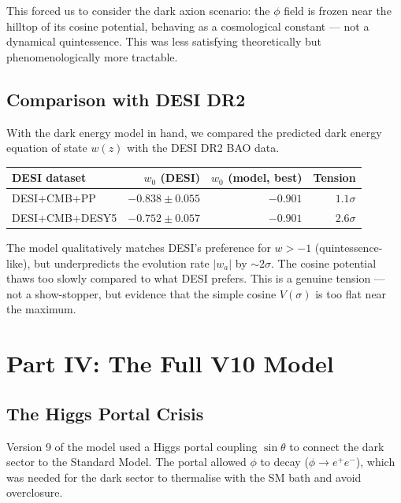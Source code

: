 \documentclass[12pt, a4paper]{article}
\newcommand{\dateentry}[1]{\medskip\noindent{\footnotesize\color{journalgray}\textbf{Date:}~#1}\smallskip}
\begin{document}
This forced us to consider the dark axion scenario: the $\phi$ field is frozen near the hilltop of its cosine potential, behaving as a cosmological constant --- not a dynamical quintessence. This was less satisfying theoretically but phenomenologically more tractable.

\subsection{Comparison with DESI DR2}

With the dark energy model in hand, we compared the predicted dark energy equation of state $w(z)$ with the DESI DR2 BAO data.

\begin{center}
\begin{tabular}{lrrr}
  \toprule
  DESI dataset & $w_0$ (DESI) & $w_0$ (model, best) & Tension \\
  \midrule
  DESI+CMB+PP  & $-0.838 \pm 0.055$ & $-0.901$ & $1.1\sigma$ \\
  DESI+CMB+DESY5 & $-0.752 \pm 0.057$ & $-0.901$ & $2.6\sigma$ \\
  \bottomrule
\end{tabular}
\end{center}

The model qualitatively matches DESI's preference for $w > -1$ (quintessence-like), but underpredicts the evolution rate $|w_a|$ by $\sim 2\sigma$. The cosine potential thaws too slowly compared to what DESI prefers. This is a genuine tension --- not a show-stopper, but evidence that the simple cosine $V(\sigma)$ is too flat near the maximum.

\newpage

\section{Part IV: The Full V10 Model}

\subsection{The Higgs Portal Crisis}

\dateentry{March 2026}

Version 9 of the model used a Higgs portal coupling $\sin\theta$ to connect the dark sector to the Standard Model. The portal allowed $\phi$ to decay ($\phi \to e^+e^-$), which was needed for the dark sector to thermalise with the SM bath and avoid overclosure.
\end{document}
